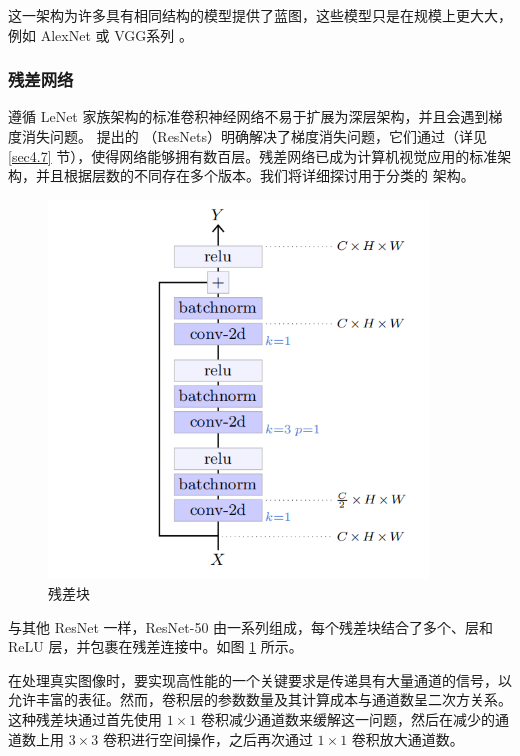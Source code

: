 这一架构为许多具有相同结构的模型提供了蓝图，这些模型只是在规模上更大大，例如 AlexNet \citep{nips-1502.c399862d3b9d6b76c8436e924a68c45b} 或 VGG系列 \citep{arxiv-1409.1556}。

\subsubsection*{残差网络}

遵循 LeNet 家族架构的标准卷积神经网络不易于扩展为深层架构，并且会遇到梯度消失问题。\citep{arxiv-1512.03385} 提出的 （ResNets）明确解决了梯度消失问题，它们通过（详见 \ref{sec4.7} 节），使得网络能够拥有数百层。残差网络已成为计算机视觉应用的标准架构，并且根据层数的不同存在多个版本。我们将详细探讨用于分类的  架构。

\begin{figure}
    \centering
    \includegraphics[width=0.9\textwidth]{fig/fig5.3.png}
    \caption[残差块]{残差块}
    \label{fig5.3}
\end{figure}

与其他 ResNet 一样，ResNet-50 由一系列组成，每个残差块结合了多个、层和 ReLU 层，并包裹在残差连接中。如图 \ref{fig5.3} 所示。

在处理真实图像时，要实现高性能的一个关键要求是传递具有大量通道的信号，以允许丰富的表征。然而，卷积层的参数数量及其计算成本与通道数呈二次方关系。这种残差块通过首先使用 $1 \times 1$ 卷积减少通道数来缓解这一问题，然后在减少的通道数上用 $3 \times 3$ 卷积进行空间操作，之后再次通过 $1 \times 1$ 卷积放大通道数。

